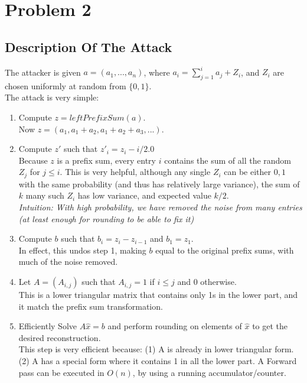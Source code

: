 \section{Problem 2}

\subsection{Description Of The Attack}
The attacker is given $a = (a_1, ..., a_n)$, where $a_i = \sum_{j=1}^{i}a_j + Z_i$, and $Z_i$ are chosen uniformly at random from $\{0, 1\}$. \\

\noindent The attack is very simple: \begin{enumerate}
    \item Compute $z = \textit{leftPrefixSum}(a)$. \\
          Now $z = (a_1, a_1 + a_2, a_1 + a_2 + a_3, ...)$.
    \item Compute $z'$ such that $z'_i = z_i - i/2.0$ \\
          Because $z$ is a prefix sum, every entry $i$ contains the sum of all the random $Z_j$ for $j \leq i$.
          This is very helpful, although any single $Z_i$ can be either $0, 1$ with the same probability (and thus has relatively large variance), the sum of $k$ many such $Z_i$ has low variance, and expected value $k/2$. \\
          \textit{Intuition: With high probability, we have removed the noise from many entries (at least enough for rounding to be able to fix it)}
    \item Compute $b$ such that $b_i = z_i - z_{i-1}$ and $b_1 = z_1$. \\
          In effect, this undos step 1, making $b$ equal to the original prefix sums, with much of the noise removed. \\
    \item Let $A = ( A_{i,j} )$ such that $A_{i, j} = 1$ if $i \leq j$ and $0$ otherwise. \\
          This is a lower triangular matrix that contains only 1s in the lower part, and it match the prefix sum transformation.
    \item Efficiently Solve $A\hat{x} = b$ and perform rounding on elements of $\hat{x}$ to get the desired reconstruction.\\
          This step is very efficient because: (1) A is already in lower triangular form. (2) A has a special form where it contains 1 in all the lower part. A Forward pass can be executed in $O(n)$, by using a running accumulator/counter.
\end{enumerate}

